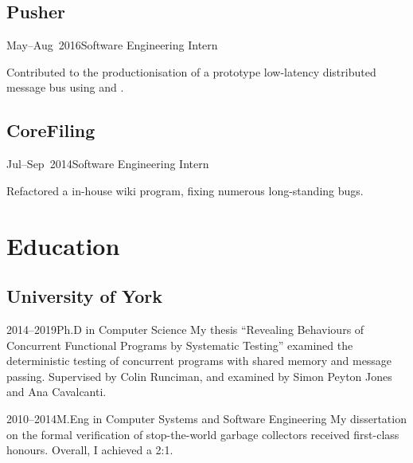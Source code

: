 \documentclass[a4paper]{barrucadu-cv}
\newcommand{\range}[2]{#1–#2}
\begin{document}
\subsection{Pusher}

\begin{cventry}{\range{May}{Aug}~2016}{Software Engineering Intern}
  \begin{tightitemize}
  \item Contributed to the productionisation of a prototype
    low-latency distributed message bus using  and
    .
  \end{tightitemize}
\end{cventry}

\subsection{CoreFiling}

\begin{cventry}{\range{Jul}{Sep}~2014}{Software Engineering Intern}
  \begin{tightitemize}
  \item Refactored a  in-house wiki program, fixing
    numerous long-standing bugs.
  \end{tightitemize}
\end{cventry}

\section{Education}

\subsection{University of York}

\begin{cventry}{\range{2014}{2019}}{Ph.D in Computer Science}
  My thesis ``Revealing Behaviours of Concurrent Functional Programs
  by Systematic Testing'' examined the deterministic testing of
  concurrent programs with shared memory and message passing.
  Supervised by Colin Runciman, and examined by Simon Peyton Jones and
  Ana Cavalcanti.
\end{cventry}

\begin{cventry}{\range{2010}{2014}}{M.Eng in Computer Systems and Software Engineering}
  My dissertation on the formal verification of stop-the-world garbage
  collectors received first-class honours.  Overall, I achieved a 2:1.
\end{cventry}
\end{document}
